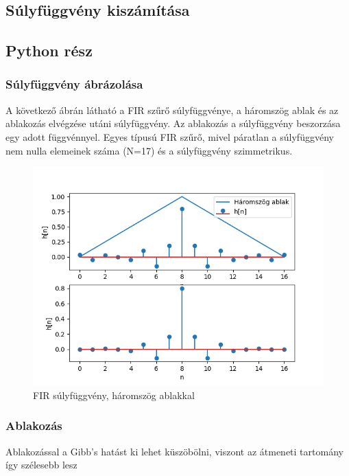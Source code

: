 \subsection{Súlyfüggvény kiszámítása}


\subsection{Python rész}

\subsubsection{Súlyfüggvény ábrázolása}

A következő ábrán látható a FIR szűrő súlyfüggvénye, a háromszög ablak és az ablakozás elvégzése utáni súlyfüggvény. Az ablakozás a súlyfüggvény beszorzása egy adott függvénnyel. Egyes típusú FIR szűrő, mivel páratlan a súlyfüggvény nem nulla elemeinek száma (N=17) és a súlyfüggvény szimmetrikus.

\begin{figure}[H]
    \centering
    \includegraphics[scale=0.6]{figures/h.png}
    \caption{FIR súlyfüggvény, háromszög ablakkal}
\end{figure}

\subsubsection{Ablakozás}

Ablakozással a Gibb's hatást ki lehet küszöbölni, viszont az átmeneti tartomány így szélesebb lesz


